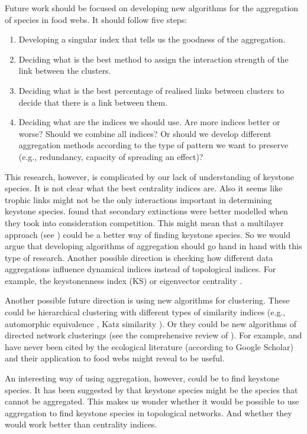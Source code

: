	Future work should be focused on developing new algorithms for the aggregation of species in food webs. It should follow five steps:
		\begin{enumerate}
			\item Developing a singular index that tells us the goodness of the aggregation.
			\item Deciding what is the best method to assign the interaction strength of the link between the clusters.
			\item Deciding what is the best percentage of realised links between clusters to decide that there is a link between them.
			\item Deciding what are the indices we should use. Are more indices better or worse? Should we combine all indices? Or should we develop different aggregation methods according to the type of pattern we want to preserve (e.g., redundancy, capacity of spreading an effect)?
		\end{enumerate}
	This research, however, is complicated by our lack of understanding of keystone species. It is not clear what the best centrality indices are. Also it seems like trophic links might not be the only interactions important in determining keystone species.	\citet{Donohue2017} found that secondary extinctions were better modelled when they took into consideration competition.	This might mean that a multilayer approach (see \citet{Pilosof2017}) could be a better way of finding keystone species.	So we would argue that developing algorithms of aggregation should go hand in hand with this type of research. Another possible direction is checking how different data aggregations influence dynamical indices instead of topological indices. For example, the keystonenness index (KS) \citep{Libralato2006} or eigenvector centrality \citep{Allesina2009}.

	Another possible future direction is using new algorithms for clustering.	These could be hierarchical clustering with different types of similarity indices (e.g., automorphic equivalence \citep{Wasserman1994}, Katz similarity \citep{Newman2018}). Or they could be new algorithms of directed network clusterings (see the comprehensive review of \citet{Malliaros2013}). For example, \citet{Zhou2005,Huang2006,Wang2008,Kim2010} and \citet{Zhan2011} have never been cited by the ecological literature (according to Google Scholar) and their application to food webs might reveal to be useful.

	An interesting way of using aggregation, however, could be to find keystone species.
	It has been suggested by \citep{Bond1994} that keystone species might be the species that cannot be aggregated.
	This makes us wonder whether it would be possible to use aggregation to find keystone species in topological networks.
	And whether they would work better than centrality indices.

